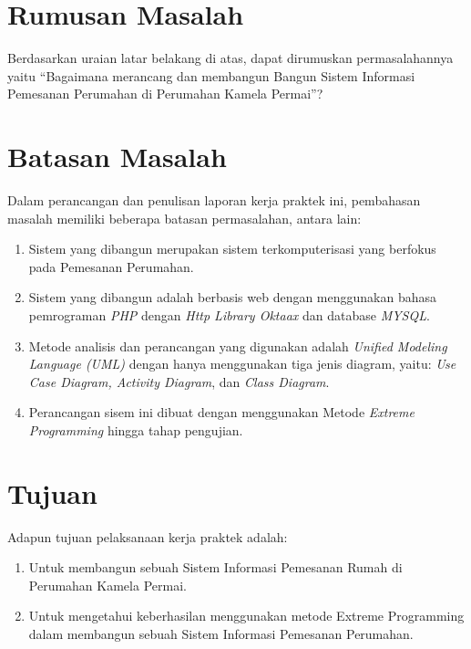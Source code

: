 \section{Rumusan Masalah}
Berdasarkan uraian latar belakang di atas, dapat dirumuskan permasalahannya yaitu “Bagaimana merancang dan membangun Bangun Sistem Informasi Pemesanan Perumahan di Perumahan Kamela Permai”?

\section{Batasan Masalah}
Dalam perancangan dan penulisan laporan kerja praktek ini, pembahasan masalah memiliki beberapa batasan permasalahan, antara lain:
\begin{enumerate}
  \item Sistem yang dibangun merupakan sistem terkomputerisasi yang berfokus pada Pemesanan Perumahan.
  \item Sistem yang dibangun adalah berbasis web dengan menggunakan bahasa pemrograman \textit{PHP} dengan \textit{Http Library Oktaax} dan database \textit{MYSQL}.
  \item Metode analisis dan perancangan yang digunakan adalah  \textit{Unified Modeling Language (UML)} dengan hanya menggunakan tiga jenis diagram, yaitu: \textit{Use Case Diagram, Activity Diagram}, dan \textit{Class Diagram}.
  \item  Perancangan sisem ini dibuat dengan menggunakan Metode \textit{Extreme Programming} hingga tahap pengujian.
\end{enumerate}

\section{Tujuan}
Adapun tujuan pelaksanaan kerja praktek adalah:

\begin{enumerate}
  \item Untuk membangun sebuah Sistem Informasi Pemesanan Rumah di Perumahan Kamela Permai.
  \item Untuk mengetahui keberhasilan menggunakan metode Extreme Programming dalam membangun sebuah  Sistem Informasi Pemesanan Perumahan.
\end{enumerate}

